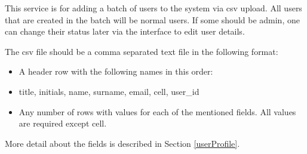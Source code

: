 This service is for adding a batch of users to the system via csv upload. All users that are created in the batch will be normal users. If some should be admin, one can change their status later via the interface to edit user details. 

The csv file should be a comma separated text file in the following format:
\begin{itemize}
\item A header row with the following names in this order:
\item title, initials, name, surname, email, cell, user\_id
\item Any number of rows with values for each of the mentioned fields. All values are required except cell.
\end{itemize}

More detail about the fields is described in Section \ref{userProfile}.

